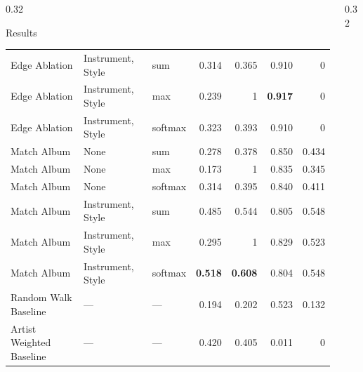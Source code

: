 \documentclass[final]{beamer}
\begin{document}
\begin{frame}[t]
\begin{columns}[t]
\begin{column}{0.32\textwidth}
\begin{block}{\Large Results}
\begin{tabular}{ll l r r r r}
					Edge Ablation & Instrument, Style & sum     & 0.314 & 0.365 & 0.910 & 0     \\
					Edge Ablation & Instrument, Style & max     & 0.239 & 1     & \textbf{0.917} & 0 \\
					Edge Ablation & Instrument, Style & softmax & 0.323 & 0.393 & 0.910 & 0 \\
					
					Match Album & None & sum     & 0.278 & 0.378 & 0.850 & 0.434 \\
					Match Album & None & max     & 0.173 & 1     & 0.835 & 0.345 \\
					Match Album & None & softmax & 0.314 & 0.395 & 0.840 & 0.411 \\
					
					Match Album & Instrument, Style & sum     & 0.485 & 0.544 & 0.805 & 0.548 \\
					Match Album & Instrument, Style & max     & 0.295 & 1     & 0.829 & 0.523 \\
					Match Album & Instrument, Style & softmax & \textbf{0.518} & \textbf{0.608} & 0.804 & 0.548 \\
					
					Random Walk Baseline & --- & --- & 0.194 & 0.202 & 0.523 & 0.132 \\
					Artist Weighted Baseline & --- & --- & 0.420 & 0.405 & 0.011 & 0 \\
					\bottomrule
				\end{tabular}
				\end{block}
			\end{column}
			
			\begin{column}{0.32\textwidth}
				

\end{column}
\end{columns}
\end{frame}
\end{document}
